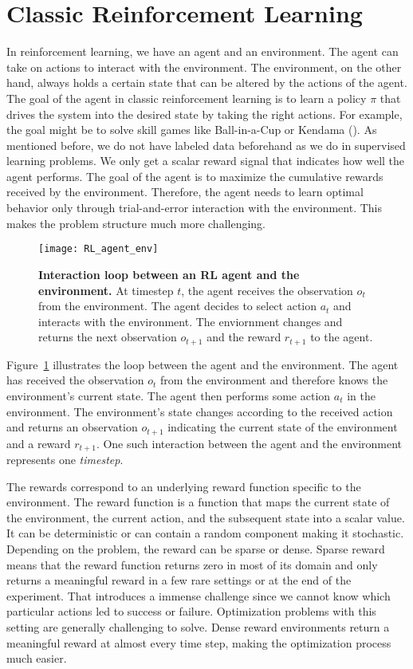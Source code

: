 \section{Classic Reinforcement Learning}
In reinforcement learning, we have an agent and an environment. The agent can take on actions to interact with the environment. The environment, on the other hand, always holds a certain state that can be altered by the actions of the agent. The goal of the agent in classic reinforcement learning is to learn a policy $\pi$ that drives the system into the desired state by taking the right actions. For example, the goal might be to solve skill games like Ball-in-a-Cup or Kendama (\cite{kober2010imitation}). As mentioned before, we do not have labeled data beforehand as we do in supervised learning problems. We only get a scalar reward signal that indicates how well the agent performs. The goal of the agent is to maximize the cumulative rewards received by the environment. Therefore, the agent needs to learn optimal behavior only through trial-and-error interaction with the environment. This makes the problem structure much more challenging.
\begin{figure}[!ht]
\centering
\texttt{[image: RL\_agent\_env]}
\caption[Interaction loop between an RL agent and the environment]{
  \textbf{Interaction loop between an RL agent and the environment.}
  At timestep $t$, the agent receives the observation $o_t$ from the environment. The agent decides to select action $a_t$ and interacts with the environment. The enviornment changes and returns the next observation $o_{t+1}$ and the reward $r_{t+1}$ to the agent.
}
\label{fig:RL_agent_env}
\end{figure}
Figure~\ref{fig:RL_agent_env} illustrates the loop between the agent and the environment. The agent has received the observation $o_t$ from the environment and therefore knows the environment's current state. The agent then performs some action $a_t$ in the environment. The environment's state changes according to the received action and returns an observation $o_{t+1}$ indicating the current state of the environment and a reward $r_{t+1}$. One such interaction between the agent and the environment represents one \emph{timestep}.

The rewards correspond to an underlying reward function specific to the environment. The reward function is a function that maps the current state of the environment, the current action, and the subsequent state into a scalar value. It can be deterministic or can contain a random component making it stochastic. Depending on the problem, the reward can be sparse or dense. Sparse reward means that the reward function returns zero in most of its domain and only returns a meaningful reward in a few rare settings or at the end of the experiment. That introduces a immense challenge since we cannot know which particular actions led to success or failure. Optimization problems with this setting are generally challenging to solve. Dense reward environments return a meaningful reward at almost every time step, making the optimization process much easier.

